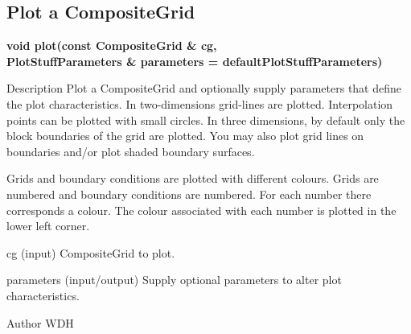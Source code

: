\subsection{Plot a CompositeGrid}
 
\begin{flushleft} \textbf{%
\settowidth{\argIndent}{void plot(}%
void plot(const CompositeGrid \& cg, \\ 
\hspace{\argIndent}      PlotStuffParameters \& parameters  = defaultPlotStuffParameters)
}\end{flushleft}
\begin{Lentry}
\item[Description] 
   Plot a CompositeGrid and optionally supply parameters that define the plot characteristics.
   In two-dimensions grid-lines are plotted. Interpolation points can be plotted with
   small circles.
   In three dimensions, by default only the block boundaries of the grid are plotted.
   You may also plot grid lines on boundaries and/or plot shaded boundary surfaces.
   

   Grids and boundary conditions are plotted with different colours. Grids are numbered
   and boundary conditions are numbered. For each number there corresponds a colour.
   The colour associated with each number is plotted in the lower left corner.
 

\item[cg (input)]  CompositeGrid to plot.
\item[parameters (input/output)]  Supply optional parameters to alter plot characteristics.

\item[Author]  WDH

\end{Lentry}
